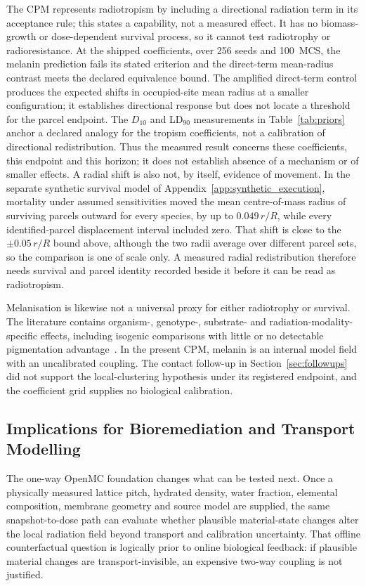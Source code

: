 \documentclass[11pt]{article}
\begin{document}
The CPM represents radiotropism by including a directional radiation term in its acceptance rule; this states a capability, not a measured effect.
It has no biomass-growth or dose-dependent survival process, so it cannot test radiotrophy or radioresistance. At the shipped coefficients,
over 256 seeds and 100~MCS, the melanin prediction fails its stated criterion and the direct-term mean-radius contrast meets the declared equivalence bound.
The amplified direct-term control produces the expected shifts in occupied-site mean radius at a smaller configuration; it establishes directional response but does not locate a threshold for the parcel endpoint.
The $D_{10}$ and LD$_{90}$ measurements in Table~\ref{tab:priors} anchor a declared analogy for the tropism coefficients, not a calibration of directional redistribution.
Thus the measured result concerns these coefficients, this endpoint and this horizon; it does not establish absence of a mechanism or of smaller effects.
A radial shift is also not, by itself, evidence of movement. In the separate synthetic survival
model of Appendix~\ref{app:synthetic_execution}, mortality under assumed sensitivities moved the mean
centre-of-mass radius of surviving parcels outward for every species, by up to $0.049\,r/R$, while
every identified-parcel displacement interval included zero. That shift is close to the
$\pm0.05\,r/R$ bound above, although the two radii average over different parcel sets, so the
comparison is one of scale only. A measured radial redistribution therefore needs survival and
parcel identity recorded beside it before it can be read as radiotropism.

Melanisation is likewise not a universal proxy for either radiotrophy or survival. The literature
contains organism-, genotype-, substrate- and radiation-modality-specific effects, including
isogenic comparisons with little or no detectable pigmentation advantage~\cite{cortesao2020,audit2026}. In the present CPM,
melanin is an internal model field with an uncalibrated coupling. The contact follow-up in
Section~\ref{sec:followups} did not support the local-clustering hypothesis under its registered
endpoint, and the coefficient grid supplies no biological calibration.

\subsection{Implications for Bioremediation and Transport Modelling}

The one-way OpenMC foundation changes what can be tested next. Once a physically measured lattice
pitch, hydrated density, water fraction, elemental composition, membrane geometry and source model
are supplied, the same snapshot-to-dose path can evaluate whether plausible material-state changes
alter the local radiation field beyond transport and calibration uncertainty. That offline
counterfactual question is logically prior to online biological feedback: if plausible material
changes are transport-invisible, an expensive two-way coupling is not justified.
\end{document}
